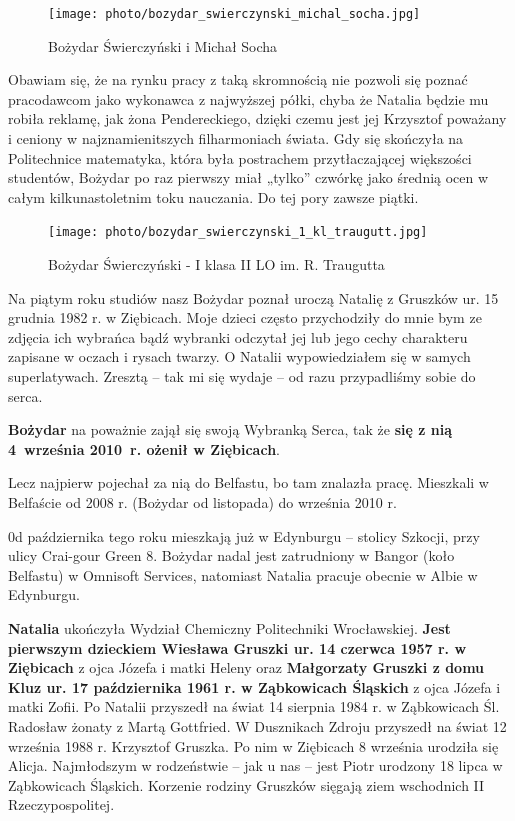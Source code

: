 \begin{figure}[!h]
\begin{center}
\texttt{[image: photo/bozydar\_swierczynski\_michal\_socha.jpg]}
\caption{Bożydar Świerczyński i Michał Socha}
\end{center}
\end{figure}

Obawiam się, że na rynku pracy z taką skromnością nie pozwoli się poznać pracodawcom jako wykonawca z najwyższej półki, chyba że Natalia będzie mu robiła reklamę, jak żona Pendereckiego, dzięki czemu jest jej Krzysztof poważany i ceniony w najznamienitszych filharmoniach świata. Gdy się skończyła na Politechnice matematyka, która była postrachem przytłaczającej większości studentów, Bożydar po raz pierwszy miał „tylko” czwórkę jako średnią ocen w całym kilkunastoletnim toku nauczania. Do tej pory zawsze piątki.
\begin{figure}[!h]
\begin{center}
\texttt{[image: photo/bozydar\_swierczynski\_1\_kl\_traugutt.jpg]}
\caption{Bożydar Świerczyński - I klasa II LO im. R. Traugutta}
\end{center}
\end{figure}

Na piątym roku studiów nasz Bożydar poznał uroczą Natalię z Gruszków ur. 15 grudnia 1982 r. w Ziębicach. Moje dzieci często przychodziły do mnie bym ze zdjęcia ich wybrańca bądź wybranki odczytał jej lub jego cechy charakteru zapisane w oczach i rysach twarzy. O Natalii wypowiedziałem się w samych superlatywach. Zresztą – tak mi się wydaje – od razu przypadliśmy sobie do serca.

\textbf{Bożydar} na poważnie zajął się swoją Wybranką Serca, tak że \textbf{się z nią 4~września 2010~r. ożenił w Ziębicach}.

Lecz najpierw pojechał za nią do Belfastu, bo tam znalazła pracę. Mieszkali w Belfaście od 2008 r. (Bożydar od listopada) do września 2010 r.

0d października tego roku mieszkają już w Edynburgu – stolicy Szkocji, przy ulicy Crai-gour Green 8. Bożydar nadal jest zatrudniony w Bangor (koło Belfastu) w Omnisoft Services, natomiast Natalia pracuje obecnie w Albie w Edynburgu.

\textbf{Natalia} ukończyła Wydział Chemiczny Politechniki Wrocławskiej. \textbf{Jest pierwszym dzieckiem Wiesława Gruszki ur. 14 czerwca 1957 r. w Ziębicach} z ojca Józefa i matki Heleny oraz \textbf{Małgorzaty Gruszki z domu Kluz ur. 17 października 1961 r. w Ząbkowicach Śląskich} z ojca Józefa i matki Zofii. Po Natalii przyszedł na świat 14 sierpnia 1984 r. w Ząbkowicach Śl. Radosław żonaty z Martą Gottfried. W Dusznikach Zdroju przyszedł na świat 12 września 1988 r. Krzysztof Gruszka. Po nim w Ziębicach 8 września urodziła się Alicja. Najmłodszym w rodzeństwie – jak u nas – jest Piotr urodzony 18 lipca w Ząbkowicach Śląskich. Korzenie rodziny Gruszków sięgają ziem wschodnich II Rzeczypospolitej.











